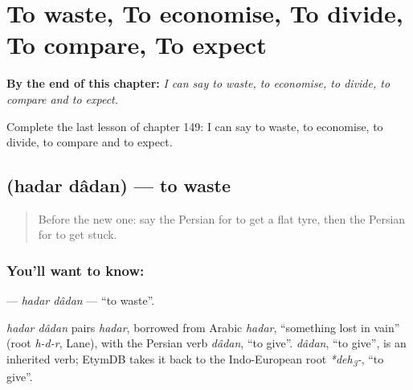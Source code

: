 
\chapter{To waste, To economise, To divide, To compare, To expect}
\label{ch:fa-to-waste-to-economise-to-divide-to-compare-to-expect}

\begin{chapteropening}
\textbf{By the end of this chapter:} \emph{I can say to waste, to economise, to divide, to compare and to expect.}

Complete the last lesson of chapter 149: I can say to waste, to economise, to divide, to compare and to expect.
\end{chapteropening}

\section[\texorpdfstring{\fa{هدر} \fa{دادن} (hadar dâdan)}{هدر دادن (hadar dâdan)}]{  (hadar dâdan) — to waste}

\label{lesson:FA-C149-hadar-dadan}



\begin{quote}
Before the new one: say the Persian for to get a flat tyre, then the Persian for to get stuck.
\end{quote}

\subsection*{You'll want to know:  }
\textbf{ } — \emph{hadar dâdan} — \textquotedblleft{}to waste\textquotedblright{}.

\begin{cousinweb}
\emph{hadar dâdan} pairs \emph{hadar}, borrowed from Arabic \emph{hadar}, \textquotedblleft{}something lost in vain\textquotedblright{} (root \emph{h-d-r}, Lane), with the Persian verb \emph{dâdan}, \textquotedblleft{}to give\textquotedblright{}. \emph{dâdan}, \textquotedblleft{}to give\textquotedblright{}, is an inherited verb; EtymDB takes it back to the Indo-European root \emph{*deh\textsubscript{3}-}, \textquotedblleft{}to give\textquotedblright{}.
\end{cousinweb}

